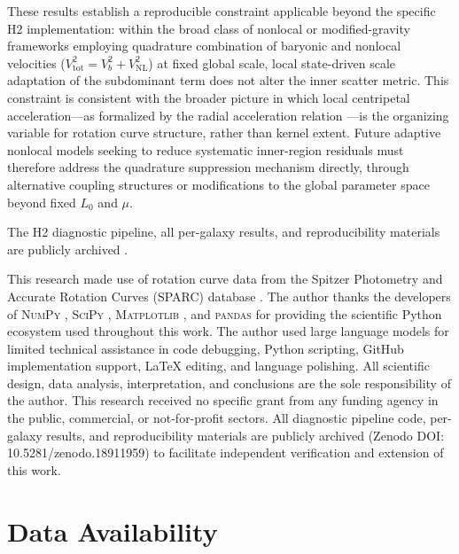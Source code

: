 \documentclass[twocolumn,linenumbers]{aastex701}
\begin{document}
These results establish a reproducible constraint applicable beyond the
specific H2 implementation: within the broad class of nonlocal or
modified-gravity frameworks employing quadrature combination of baryonic
and nonlocal velocities ($V^2_{\mathrm{tot}} = V^2_b + V^2_{\mathrm{NL}}$)
at fixed global scale, local state-driven scale adaptation of the subdominant
term does not alter the inner scatter metric. This constraint is consistent
with the broader picture in which local centripetal acceleration---as
formalized by the radial acceleration relation \citep{mcgaugh2016,lelli2017}---is
the organizing variable for rotation curve structure, rather than kernel extent.
Future adaptive nonlocal models seeking to reduce systematic inner-region
residuals must therefore address the quadrature suppression mechanism
directly, through alternative coupling structures or modifications to the
global parameter space beyond fixed $L_0$ and $\mu$.

The H2 diagnostic pipeline, all per-galaxy results, and reproducibility
materials are publicly archived \citep{h2model2026}.

\begin{acknowledgments}
This research made use of rotation curve data from the Spitzer Photometry
and Accurate Rotation Curves (SPARC) database \citep{lelli2016}. The author
thanks the developers of \textsc{NumPy} \citep{numpy2020}, \textsc{SciPy}
\citep{scipy2020}, \textsc{Matplotlib} \citep{matplotlib2007}, and
\textsc{pandas} \citep{pandas2010} for providing the scientific Python
ecosystem used throughout this work. The author used large language models
for limited technical assistance in code debugging, Python scripting, GitHub
implementation support, LaTeX editing, and language polishing. All
scientific design, data analysis, interpretation, and conclusions are the
sole responsibility of the author. This research received no specific grant
from any funding agency in the public, commercial, or not-for-profit sectors.
All diagnostic pipeline code, per-galaxy results, and reproducibility
materials are publicly archived (Zenodo DOI: 10.5281/zenodo.18911959) to
facilitate independent verification and extension of this work.
\end{acknowledgments}

\section*{Data Availability}
\end{document}
